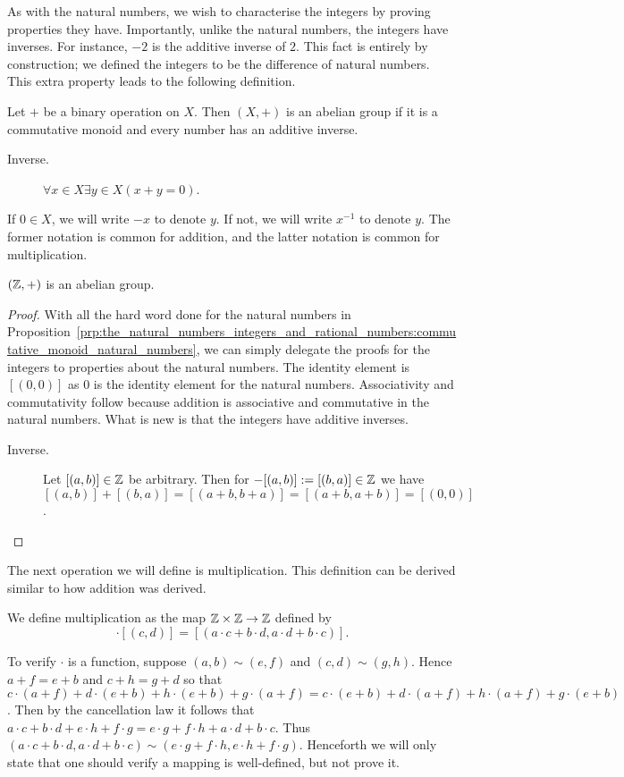 \documentclass[../main.tex]{subfiles}
\begin{document}
As with the natural numbers, we wish to characterise the integers by proving properties they have. Importantly, unlike the natural numbers, the integers have inverses. For instance, $-2$ is the additive inverse of $2$. This fact is entirely by construction; we defined the integers to be the difference of natural numbers. This extra property leads to the following definition.
\begin{definition}
    Let $+$ be a binary operation on $X$. Then $(X,+)$ is an abelian group if it is a commutative monoid and every number has an additive inverse.
    \begin{description}
        \item[Inverse.] $\forall x\in X\exists y\in X(x+y=0)$.
    \end{description}
    If $0\in X$, we will write $-x$ to denote $y$. If not, we will write $x^{-1}$ to denote $y$. The former notation is common for addition, and the latter notation is common for multiplication.
\end{definition}
\begin{proposition}\label{prp:the_natural_numbers_integers_and_rational_numbers:abelian_group_integers}
    $(\mathbb{Z},+)$ is an abelian group.
\end{proposition}
\begin{proof}
    With all the hard word done for the natural numbers in Proposition~\ref{prp:the_natural_numbers_integers_and_rational_numbers:commutative_monoid_natural_numbers}, we can simply delegate the proofs for the integers to properties about the natural numbers. The identity element is $[(0,0)]$ as $0$ is the identity element for the natural numbers. Associativity and commutativity follow because addition is associative and commutative in the natural numbers. What is new is that the integers have additive inverses.
    \begin{description}
        \item[Inverse.] Let $[(a,b)]\in\mathbb{Z}$ be arbitrary. Then for $-[(a,b)]:=[(b,a)]\in\mathbb{Z}$ we have $[(a,b)]+[(b,a)]=[(a+b,b+a)]=[(a+b,a+b)]=[(0,0)]$.
    \end{description}
\end{proof}
The next operation we will define is multiplication. This definition can be derived similar to how addition was derived.
\begin{definition}
    We define multiplication as the map $\mathbb{Z}\times\mathbb{Z}\to\mathbb{Z}$ defined by
    \begin{equation*}
        [(a,b)]\cdot[(c,d)]=[(a\cdot c+b\cdot d,a\cdot d+b\cdot c)].
    \end{equation*}
\end{definition}
To verify $\cdot$ is a function, suppose $(a,b)\sim(e,f)$ and $(c,d)\sim(g,h)$. Hence $a+f=e+b$ and $c+h=g+d$ so that $c\cdot(a+f)+d\cdot(e+b)+h\cdot(e+b)+g\cdot(a+f)=c\cdot(e+b)+d\cdot(a+f)+h\cdot(a+f)+g\cdot(e+b)$. Then by the cancellation law it follows that $a\cdot c+b\cdot d+e\cdot h+f\cdot g=e\cdot g+f\cdot h+a\cdot d+b\cdot c$. Thus $(a\cdot c+b\cdot d,a\cdot d+b\cdot c)\sim(e\cdot g+f\cdot h,e\cdot h+f\cdot g)$. Henceforth we will only state that one should verify a mapping is well-defined, but not prove it.
\end{document}
